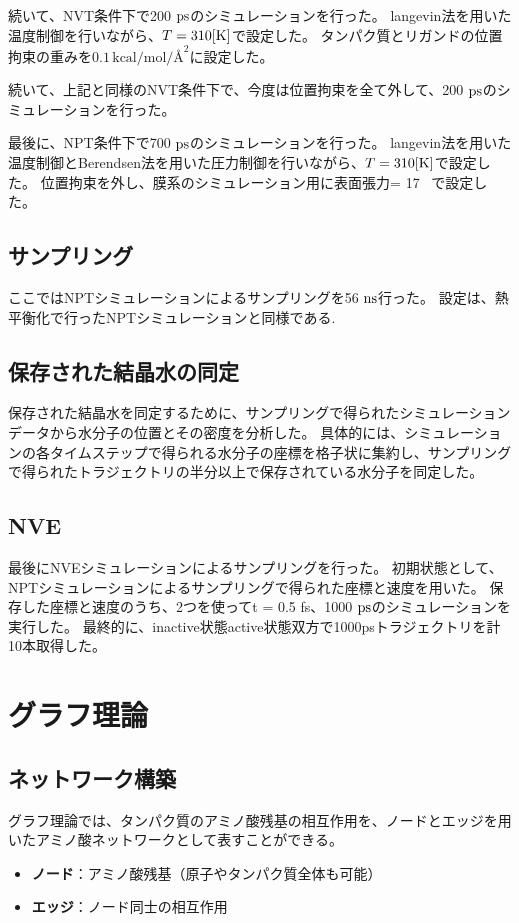 続いて、NVT条件下で200 $\rm{ps}$のシミュレーションを行った。
langevin法を用いた温度制御を行いながら、$T = 310 \rm{[K]}$で設定した。
タンパク質とリガンドの位置拘束の重みを$0.1 \, \text{kcal/mol/\AA}^2$に設定した。

続いて、上記と同様のNVT条件下で、今度は位置拘束を全て外して、200 $\rm{ps}$のシミュレーションを行った。

最後に、NP\gamma T条件下で700 $\rm{ps}$のシミュレーションを行った。
langevin法を用いた温度制御とBerendsen法を用いた圧力制御を行いながら、$T = 310 \rm{[K]}$で設定した。
位置拘束を外し、膜系のシミュレーション用に表面張力\gamma = 17 \, で設定した。

\subsection{サンプリング}
ここではNP\gamma Tシミュレーションによるサンプリングを56 $\rm{ns}$行った。
設定は、熱平衡化で行ったNP\gamma Tシミュレーションと同様である.

\subsection{保存された結晶水の同定}
保存された結晶水を同定するために、サンプリングで得られたシミュレーションデータから水分子の位置とその密度を分析した。
具体的には、シミュレーションの各タイムステップで得られる水分子の座標を格子状に集約し、サンプリングで得られたトラジェクトリの半分以上で保存されている水分子を同定した。

\subsection{NVE}
最後にNVEシミュレーションによるサンプリングを行った。
初期状態として、NP\gamma Tシミュレーションによるサンプリングで得られた座標と速度を用いた。
保存した座標と速度のうち、2つを使って\Delta t = 0.5 fs、1000 $\rm{ps}$のシミュレーションを実行した。
最終的に、inactive状態active状態双方で1000psトラジェクトリを計10本取得した。

\section{グラフ理論}
\label{sec:graph theory}

\subsection{ネットワーク構築}
グラフ理論では、タンパク質のアミノ酸残基の相互作用を、ノードとエッジを用いたアミノ酸ネットワークとして表すことができる。
\begin{itemize}
  \item \textbf{ノード}：アミノ酸残基（原子やタンパク質全体も可能）
  \item \textbf{エッジ}：ノード同士の相互作用
\end{itemize}

